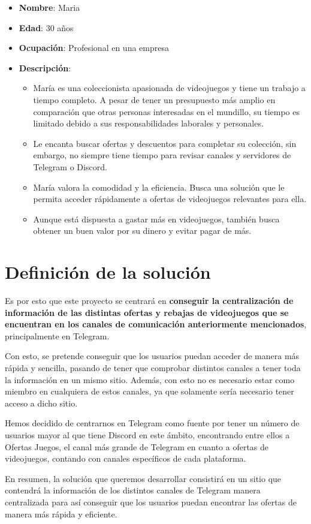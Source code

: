 \begin{itemize}
    \item \textbf{Nombre}: Maria
    \item \textbf{Edad}: 30 años
    \item \textbf{Ocupación}: Profesional en una empresa
    \item \textbf{Descripción}:
    \begin{itemize}
        \item María es una coleccionista apasionada de videojuegos y tiene un 
        trabajo a tiempo completo. A pesar de tener un presupuesto más amplio en 
        comparación que otras personas interesadas en el mundillo, su tiempo es 
        limitado debido a sus responsabilidades laborales y personales.
        \item Le encanta buscar ofertas y descuentos para completar su colección, 
        sin embargo, no siempre tiene tiempo para revisar canales y servidores de 
        Telegram o Discord.
        \item María valora la comodidad y la eficiencia. Busca una solución que le 
        permita acceder rápidamente a ofertas de videojuegos relevantes para ella.
        \item Aunque está dispuesta a gastar más en videojuegos, también busca 
        obtener un buen valor por su dinero y evitar pagar de más.
    \end{itemize}
\end{itemize}

\section{Definición de la solución}

Es por esto que este proyecto se centrará en \textbf{conseguir la centralización de 
información de las distintas ofertas y rebajas de videojuegos que se encuentran en 
los canales de comunicación anteriormente mencionados}, principalmente en Telegram.

Con esto, se pretende conseguir que los usuarios puedan acceder de manera más 
rápida y sencilla, pasando de tener que comprobar distintos canales a tener toda la 
información en un mismo sitio. Además, con esto no es necesario estar como miembro 
en cualquiera de estos canales, ya que solamente sería necesario tener acceso a 
dicho sitio.

Hemos decidido de centrarnos en Telegram como fuente por tener un número de 
usuarios mayor al que tiene Discord en este ámbito, encontrando entre ellos a 
Ofertas Juegos, el canal más grande de Telegram en cuanto a ofertas de videojuegos, 
contando con canales específicos de cada plataforma.

En resumen, la solución que queremos desarrollar consistirá en un sitio que 
contendrá la información de los distintos canales de Telegram manera centralizada 
para así conseguir que los usuarios puedan encontrar las ofertas de manera más 
rápida y eficiente.
